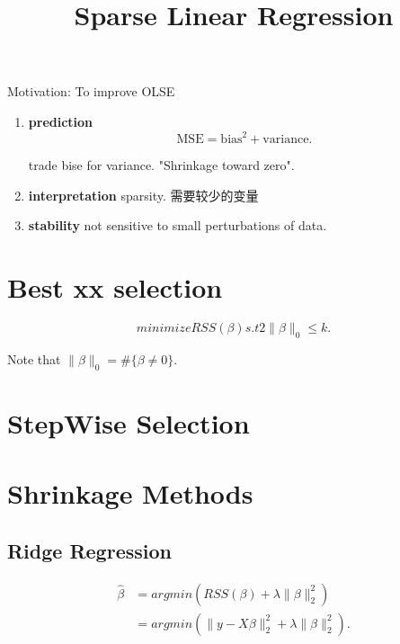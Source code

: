 \documentclass[UTF8]{ctexart}
\begin{document}
\title{Sparse Linear Regression}
\maketitle

Motivation: To improve OLSE

\begin{enumerate}
    \item \textbf{prediction} 
        \[
            \text{MSE} = \text{bias}^2 + \text{variance}
    .\] 

trade bise for variance. "Shrinkage toward zero". 

    \item \textbf{interpretation} sparsity. 需要较少的变量

    \item \textbf{stability} not sensitive to small perturbations of data.

\end{enumerate}

\section{Best xx selection}%
\label{sec:best_xx_selection}

\[
    minimize  RSS\left( \beta \right) s.t 2\|\beta\|_0 \le k
.\] 

Note that  $\|\beta\|_0 = \#\{\beta \neq 0\}$.


\section{StepWise Selection}%
\label{sec:stepwise_selection}

\section{Shrinkage Methods}%
\label{sec:shrinkage_methods}


\subsection{Ridge Regression}%
\label{sub:ridge_regression}

\begin{align*}
    \hat{\beta} &= argmin \left(RSS\left(\beta  \right) + \lambda \|\beta\|^2_2 \right) \\
       &= argmin (\|y-X\beta\|_2^2 + \lambda \|\beta\|_2^2)
.\end{align*}
\end{document}
